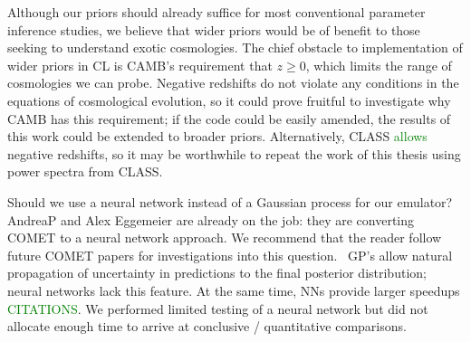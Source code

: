 

Although our priors should already suffice for most conventional parameter
inference studies, we believe that wider priors would be of benefit to those
seeking to understand exotic cosmologies. The chief obstacle to 
implementation of wider priors in CL is CAMB's requirement that $z \geq 0$,
which limits the range of cosmologies we can probe. 
Negative redshifts do not violate any conditions in the equations of
cosmological evolution, so it could prove fruitful to investigate why CAMB 
has this requirement; if the code could be easily amended, the results of
this work could be extended to broader priors. Alternatively,
CLASS \textcolor{green}{allows} negative redshifts, so it may be worthwhile 
to repeat the work of this thesis using power spectra from CLASS.

Should we use a neural network instead of a Gaussian process for our emulator? 
AndreaP and Alex Eggemeier are already on the job: they are converting COMET 
to a neural network approach. We recommend that the reader follow future COMET 
papers for investigations into this question.
\
GP's allow natural propagation of
uncertainty in predictions to the final posterior distribution; neural
networks lack this feature. At the same time, NNs provide larger speedups 
\textcolor{green}{CITATIONS}. We performed limited testing of a neural network
but did not allocate enough time to arrive at conclusive / quantitative
comparisons.




\begin{comment}
The code should be expanded with documentation and unit tests. Also, the
user interface script is still in progress.

To simplify the user experience, this two-emulator solution lives ``under the
hood'' and by default \textcolor{orange}{will be} hidden behind an interface
which automatically queries the correct emulator given some user-input
cosmology.
\end{comment}

